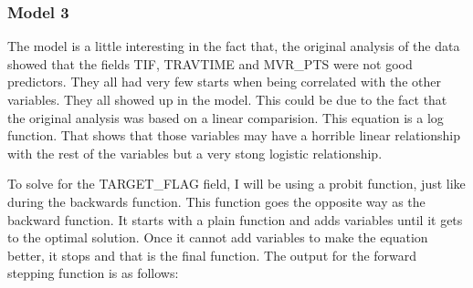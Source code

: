 \documentclass[]{article}
\begin{document}
\subsubsection{Model 3}\label{model-3}

The model is a little interesting in the fact that, the original
analysis of the data showed that the fields TIF, TRAVTIME and MVR\_PTS
were not good predictors. They all had very few starts when being
correlated with the other variables. They all showed up in the model.
This could be due to the fact that the original analysis was based on a
linear comparision. This equation is a log function. That shows that
those variables may have a horrible linear relationship with the rest of
the variables but a very stong logistic relationship.

To solve for the TARGET\_FLAG field, I will be using a probit function,
just like during the backwards function. This function goes the opposite
way as the backward function. It starts with a plain function and adds
variables until it gets to the optimal solution. Once it cannot add
variables to make the equation better, it stops and that is the final
function. The output for the forward stepping function is as follows:
\end{document}
